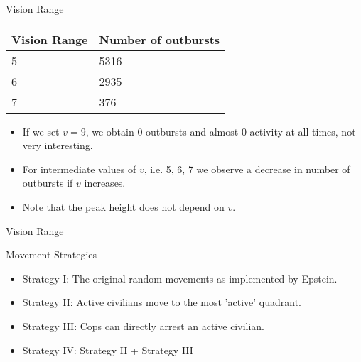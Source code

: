 \documentclass[red]{beamer}
\begin{document}
\begin{frame}{Vision Range}

    \begin{table}[H]
      \footnotesize
      \centering
      \begin{tabular}{l | l}
        Vision Range & Number of outbursts \\
        \hline
        5 & 5316 \\
        6 & 2935 \\
        7 & 376
      \end{tabular}
      \label{tab:outburst}
    \end{table}

    \begin{itemize}
    \item
      If we set $v = 9$, we obtain 0 outbursts and almost 0 activity at all times, not very interesting.
    \item
      For intermediate values of $v$, i.e. 5, 6, 7 we observe a decrease in number of outbursts if $v$ increases.
    \item
      Note that the peak height does not depend on $v$.
    \end{itemize}
\end{frame}

\begin{frame}{Vision Range}

  \begin{figure}[H]
    \centering
    \label{fig:originals}
  \end{figure}

\end{frame}


\begin{frame}{Movement Strategies}
  \begin{itemize}
  \item
    Strategy I: The original random movements as implemented by Epstein.
  \item
    Strategy II: Active civilians move to the most 'active' quadrant.
  \item
    Strategy III: Cops can directly arrest an active civilian.
  \item
    Strategy IV: Strategy II + Strategy III
  \end{itemize}

\end{frame}
\end{document}
